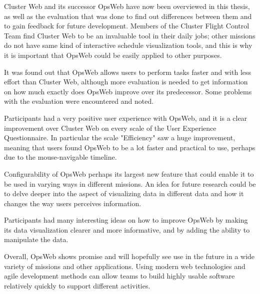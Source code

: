 
Cluster Web and its successor OpsWeb have now been overviewed in this thesis, as well as the evaluation that was done to find out differences between them and to gain feedback for future development. Members of the Cluster Flight Control Team find Cluster Web to be an invaluable tool in their daily jobs; other missions do not have same kind of interactive schedule visualization tools, and this is why it is important that OpsWeb could be easily applied to other purposes.

It was found out that OpsWeb allows users to perform tasks faster and with less effort than Cluster Web, although more evaluation is needed to get information on how much exactly does OpsWeb improve over its predecessor. Some problems with the evaluation were encountered and noted.

Participants had a very positive user experience with OpsWeb, and it is a clear improvement over Cluster Web on every scale of the User Experience Questionnaire. In particular the scale "Efficiency" saw a huge improvement, meaning that users found OpsWeb to be a lot faster and practical to use, perhaps due to the mouse-navigable timeline.

Configurability of OpsWeb perhaps its largest new feature that could enable it to be used in varying ways in different missions. An idea for future research could be to delve deeper into the aspect of visualizing data in different data and how it changes the way users perceives information.

Participants had many interesting ideas on how to improve OpsWeb by making its data visualization clearer and more informative, and by adding the ability to manipulate the data.

Overall, OpsWeb shows promise and will hopefully see use in the future in a wide variety of missions and other applications. Using modern web technologies and agile development methods can allow teams to build highly usable software relatively quickly to support different activities.